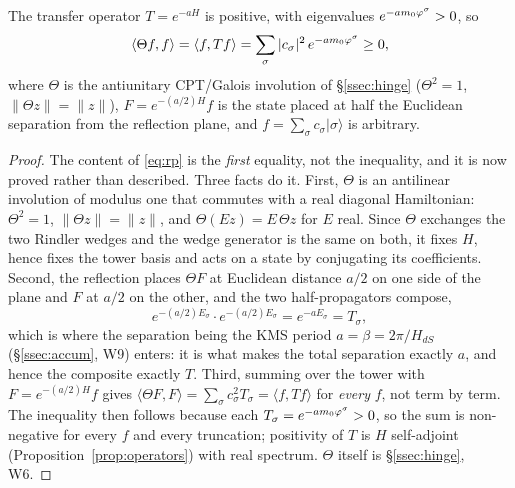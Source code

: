 \begin{proposition}\label{prop:rp}
The transfer operator $T=e^{-aH}$ is positive, with eigenvalues $e^{-a m_0\varphi^{\sigma}}>0$, so
\begin{equation}\label{eq:rp}
  \langle\Theta f,f\rangle=\langle f,Tf\rangle=\sum_{\sigma}|c_\sigma|^2\,e^{-a m_0\varphi^{\sigma}}\ge0,
\end{equation}
where $\Theta$ is the antiunitary CPT/Galois involution of \S\ref*{ssec:hinge} ($\Theta^2=1$,
$\lVert\Theta z\rVert=\lVert z\rVert$), $F=e^{-(a/2)H}f$ is the state placed at half the
Euclidean separation from the reflection plane, and $f=\sum_\sigma c_\sigma\lvert\sigma\rangle$ is
arbitrary.


\end{proposition}
\begin{proof}
The content of \eqref{eq:rp} is the \emph{first} equality, not the inequality, and it is now
proved rather than described. Three facts do it. First, $\Theta$ is an antilinear involution of
modulus one that commutes with a real diagonal Hamiltonian: $\Theta^2=1$,
$\lVert\Theta z\rVert=\lVert z\rVert$, and $\Theta(Ez)=E\,\Theta z$ for $E$ real. Since $\Theta$
exchanges the two Rindler wedges and the wedge generator is the same on both, it fixes $H$, hence
fixes the tower basis and acts on a state by conjugating its coefficients. Second, the reflection
places $\Theta F$ at Euclidean distance $a/2$ on one side of the plane and $F$ at $a/2$ on the
other, and the two half-propagators compose,
\begin{equation}\label{eq:half-prop}
  e^{-(a/2)E_\sigma}\cdot e^{-(a/2)E_\sigma}=e^{-aE_\sigma}=T_\sigma ,
\end{equation}
which is where the separation being the KMS period $a=\beta=2\pi/H_{dS}$
(\S\ref*{ssec:accum}, W9) enters: it is what makes the total separation exactly $a$, and hence the
composite exactly $T$. Third, summing over the tower with $F=e^{-(a/2)H}f$ gives
$\langle\Theta F,F\rangle=\sum_\sigma c_\sigma^{2}T_\sigma=\langle f,Tf\rangle$ for \emph{every}
$f$, not term by term. The inequality then follows because each
$T_\sigma=e^{-am_0\varphi^{\sigma}}>0$, so the sum is non-negative for every $f$ and every
truncation; positivity of $T$ is $H$ self-adjoint (Proposition~\ref{prop:operators}) with real
spectrum. $\Theta$ itself is \S\ref*{ssec:hinge}, W6.
\end{proof}

